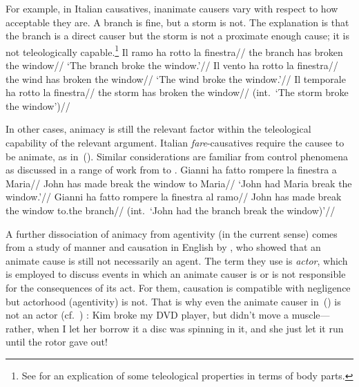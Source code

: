 {For example, in Italian causatives, inanimate causers vary with respect to how acceptable they are. A branch is fine, but a storm is not. The explanation is that the branch is a direct causer but the storm is not a proximate enough cause; it is not teleologically capable.\footnote{See \cite{irwin18tlr} for an explication of some teleological properties in terms of body parts.}
\pex
	\a \begingl
		\gla Il ramo ha rotto la finestra//
		\glb the branch has broken the window//
		\glft `The branch broke the window.'//
		\endgl
	\a \begingl
		\gla {}Il vento ha rotto la finestra//
		\glb the wind has broken the window//
		\glft `The wind broke the window.'//
		\endgl
	\a \begingl
		\gla \ljudge{\#}Il temporale ha rotto la finestra//
		\glb the storm has broken the window//
		\glft (int.~`The storm broke the window')//
		\endgl
\xe		

In other cases, animacy is still the relevant factor within the teleological capability of the relevant argument. Italian \emph{fare}-causatives require the causee to be animate, as in~(\nextx). Similar considerations are familiar from control phenomena as discussed in a range of work from \cite{farkas88} to \cite{zu18phd}.
\pex
	\a \begingl
		\gla Gianni ha fatto rompere la finestra a Maria//
		\glb John has made break the window to Maria//
		\glft `John had Maria break the window.'//
		\endgl
	\a \begingl
		\gla \ljudge{\#}Gianni ha fatto rompere la finestra al ramo//
		\glb John has made break the window to.the branch//
		\glft (int.~`John had the branch break the window)'//
		\endgl
\xe	

A further dissociation of animacy from agentivity (in the current sense) comes from a study of manner and causation in English by \cite{beaverskoontzgarboden12}, who showed that an animate cause is still not necessarily an agent. The term they use is \emph{actor}, which is employed to discuss events in which an animate causer is or is not responsible for the consequences of its act. For them, causation is compatible with negligence but actorhood (agentivity) is not. That is why even the animate causer in~(\nextx) is not an actor (cf.~\citealt{rappaporthovav14}) :
\ex Kim broke my DVD player, but didn’t move a muscle—rather, when I let her borrow it a disc was spinning in it, and she just let it run until the rotor gave out!
\xe

}
